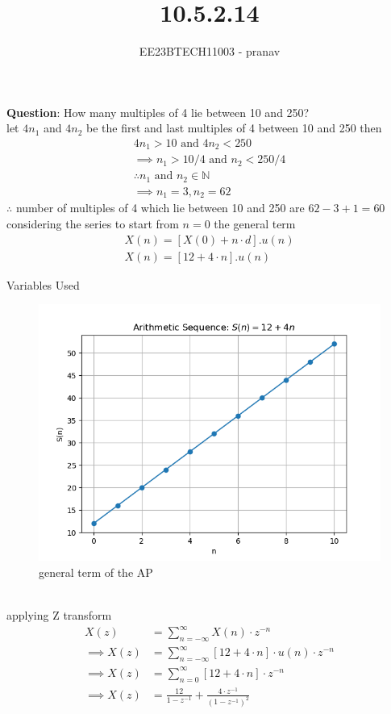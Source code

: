 \documentclass[journal,12pt,twocolumn]{IEEEtran}
\theoremstyle{remark}
\begin{document}

\vspace{3cm}

\title{10.5.2.14}
\author{EE23BTECH11003 - pranav}
\maketitle
\newpage

\bigskip


\textbf{Question}:
How many multiples of 4 lie between 10 and 250?\\
\solution
let $4n_{1}$ and $4n_{2}$ be the first and last multiples of 4 between 10 and 250 then
\begin{align}
     4n_{1}>10   \text{ and }  4n_{2}<250  \\
 \implies n_{1}>10/4\text{ and } n_{2}<250/4\\
 \therefore n_{1} \text{ and } n_{2} \in \mathbb{N}\\
\implies n_{1}=3,n_{2}=62 
\end{align}
 $\therefore$ number of multiples of 4 which lie between  10 and 250 are $62-3+1=60$ \\
considering the series to start from $n=0$ the general term
\begin{align}
X(n)=[X(0)+n\cdot d].u(n)\\
X(n)=[12+4\cdot n].u(n)
\end{align}
\begin{table}[h]
    \centering
    
    \caption{Variables Used}
    \label{tab:table_11.9.3.6}
\end{table}
\begin{figure}[h!]
    \centering
    \includegraphics[width=1.1\linewidth]{figs/graph1.png}
    \caption{general term of the AP}
\end{figure}\\
applying Z transform
\begin{align}
    X(z)&= \sum_{n=-\infty}^{\infty}X(n)\cdot z^{-n}\\
   \implies X(z)&= \sum_{n=-\infty}^{\infty} [12+4\cdot n]\cdot u(n)\cdot z^{-n}\\
   \implies X(z) &=\sum_{n= 0}^{\infty} [12+4\cdot n] \cdot z^{-n}\\
   \implies X(z)&= \frac{12}{1-z^{-1}} +\frac{4\cdot z^{-1}}{(1-z^{-1})^{2}}
\end{align}
\end{document}
